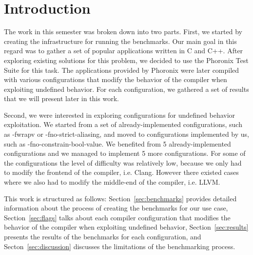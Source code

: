 \section{Introduction}

The work in this semester was broken down into two parts. First, we started by
creating the infrastructure for running the benchmarks. Our main goal in this
regard was to gather a set of popular applications written in C and C++. After
exploring existing solutions for this problem, we decided to use the Phoronix
Test Suite for this task. The applications provided by Phoronix were later
compiled with various configurations that modify the behavior of the compiler
when exploiting undefined behavior. For each configuration, we gathered a set of
results that we will present later in this work.

Second, we were interested in exploring configurations for undefined behavior
exploitation. We started from a set of already-implemented configurations, such
as -fwrapv or -fno-strict-aliasing, and moved to configurations implemented by
us, such as -fno-constrain-bool-value. We benefited from 5 already-implemented
configurations and we managed to implement 5 more configurations. For some of
the configurations the level of difficulty was relatively low, because we only
had to modify the frontend of the compiler, i.e. Clang. However there existed
cases where we also had to modify the middle-end of the compiler, i.e. LLVM.

This work is structured as follows: Section~\ref{sec:benchmarks} provides
detailed information about the process of creating the benchmarks for our use
case, Section~\ref{sec:flags} talks about each compiler configuration that
modifies the behavior of the compiler when exploiting undefined behavior,
Section~\ref{sec:results} presents the results of the benchmarks for each
configuration, and Secton~\ref{sec:discussion} discusses the limitations of the
benchmarking process.
